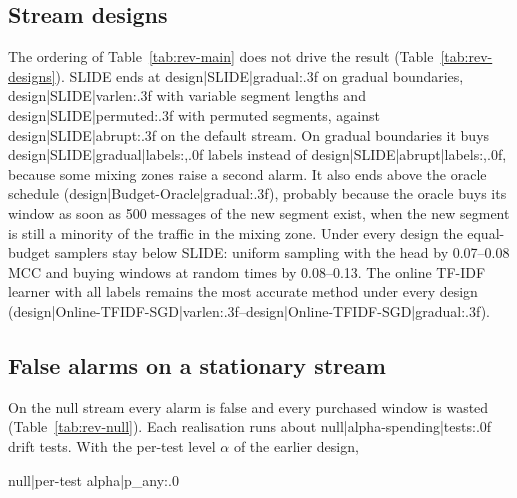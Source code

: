 {{{{\subsection{Stream designs}\label{sec:designs}
The ordering of Table~\ref{tab:rev-main} does not drive the result (Table~\ref{tab:rev-designs}). SLIDE ends at {{design|SLIDE|gradual:.3f}} on gradual boundaries, {{design|SLIDE|varlen:.3f}} with variable segment lengths and {{design|SLIDE|permuted:.3f}} with permuted segments, against {{design|SLIDE|abrupt:.3f}} on the default stream. On gradual boundaries it buys {{design|SLIDE|gradual|labels:,.0f}} labels instead of {{design|SLIDE|abrupt|labels:,.0f}}, because some mixing zones raise a second alarm. It also ends above the oracle schedule ({{design|Budget-Oracle|gradual:.3f}}), probably because the oracle buys its window as soon as 500 messages of the new segment exist, when the new segment is still a minority of the traffic in the mixing zone. Under every design the equal-budget samplers stay below SLIDE: uniform sampling with the head by 0.07--0.08 MCC and buying windows at random times by 0.08--0.13. The online TF-IDF learner with all labels remains the most accurate method under every design ({{design|Online-TFIDF-SGD|varlen:.3f}}--{{design|Online-TFIDF-SGD|gradual:.3f}}).



\subsection{False alarms on a stationary stream}\label{sec:null}
On the null stream every alarm is false and every purchased window is wasted (Table~\ref{tab:rev-null}). Each realisation runs about {{null|alpha-spending|tests:.0f}} drift tests. With the per-test level $\alpha$ of the earlier design, {{null|per-test alpha|p_any:.0%

}}}}}}
